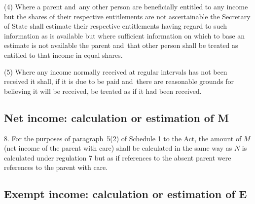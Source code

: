 \documentclass[12pt,a4paper]{article}
\begin{document}
(4) Where a parent and~any other person are beneficially entitled to any income but the shares of their respective entitlements are not ascertainable the 
Secretary of State  %
shall estimate their respective entitlements having regard to such information as is available but where sufficient information on which to base an estimate is not available the parent and~that other person shall be treated as entitled to that income in equal shares.

(5) Where any income normally received at regular intervals has not been received it shall, if it is due to be paid and~there are reasonable grounds for believing it will be received, be treated as if it had been received.


\subsection[8. Net income: calculation or estimation of M]{Net income: calculation or estimation of M}

8.  For the purposes of paragraph~5(2) of Schedule 1 to the Act, the amount of $M$ (net income of the parent with care) shall be calculated in the same way as $N$ is calculated under regulation 7 but as if references to the absent parent were references to the parent with care.

\subsection[9. Exempt income: calculation or estimation of E]{Exempt income: calculation or estimation of E}
\end{document}

